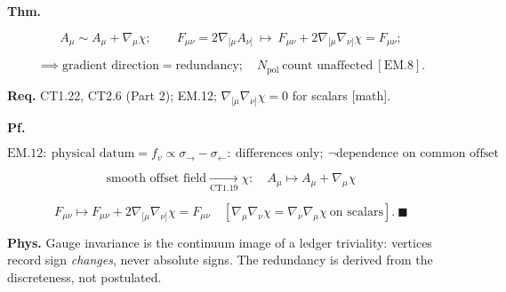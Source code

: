 \begin{theorem}\label{tag:EM-14}
\textbf{Thm.}

\[
A_\mu\sim A_\mu+\nabla_\mu\chi;\qquad
F_{\mu\nu}=2\nabla_{[\mu}A_{\nu]}\ \mapsto\ F_{\mu\nu}+2\nabla_{[\mu}\nabla_{\nu]}\chi=F_{\mu\nu};
\]

\[
\implies\text{gradient direction}=\text{redundancy};\quad N_{\mathrm{pol}}\ \text{count unaffected}\ [\mathrm{EM.8}].
\]

\textbf{Req.} CT1.22, CT2.6 (Part 2); EM.12; $\nabla_{[\mu}\nabla_{\nu]}\chi=0$ for scalars [math].

\textbf{Pf.}

\[
\mathrm{EM.12}:\ \text{physical datum}=f_v\propto\sigma_{\rightarrow}-\sigma_{\leftarrow}:\ \text{differences only};\ \neg\text{dependence on common offset}
\]

\[
\text{smooth offset field}\xrightarrow[\mathrm{CT1.19}]{}\chi:\quad A_\mu\mapsto A_\mu+\nabla_\mu\chi
\]

\[
F_{\mu\nu}\mapsto F_{\mu\nu}+2\nabla_{[\mu}\nabla_{\nu]}\chi=F_{\mu\nu}\quad[\nabla_\mu\nabla_\nu\chi=\nabla_\nu\nabla_\mu\chi\ \text{on scalars}].\ \blacksquare
\]

\textbf{Phys.} Gauge invariance is the continuum image of a ledger triviality: vertices record sign \textit{changes}, never absolute signs. The redundancy is derived from the discreteness, not postulated.

\end{theorem}

